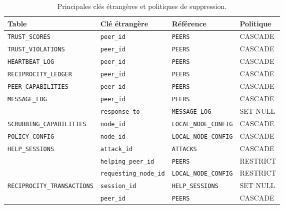 \begin{table}[H]
\centering
\caption{Principales clés étrangères et politiques de suppression.}
\label{tab:fk}
\small
\renewcommand{\arraystretch}{1.35}

\begin{tabularx}{\textwidth}{|l|l|l|X|}
\hline
\textbf{Table} & \textbf{Clé étrangère} & \textbf{Référence} & \textbf{Politique} \\
\hline
\texttt{TRUST\_SCORES}         & \texttt{peer\_id}          & \texttt{PEERS}              & CASCADE  \\
\hline
\texttt{TRUST\_VIOLATIONS}     & \texttt{peer\_id}          & \texttt{PEERS}              & CASCADE  \\
\hline
\texttt{HEARTBEAT\_LOG}        & \texttt{peer\_id}          & \texttt{PEERS}              & CASCADE  \\
\hline
\texttt{RECIPROCITY\_LEDGER}   & \texttt{peer\_id}          & \texttt{PEERS}              & CASCADE  \\
\hline
\texttt{PEER\_CAPABILITIES}    & \texttt{peer\_id}          & \texttt{PEERS}              & CASCADE  \\
\hline
\multirow{2}{*}{\texttt{MESSAGE\_LOG}}
    & \texttt{peer\_id}     & \texttt{PEERS}        & CASCADE  \\
\cline{2-4}
    & \texttt{response\_to} & \texttt{MESSAGE\_LOG} & SET NULL \\
\hline
\texttt{SCRUBBING\_CAPABILITIES} & \texttt{node\_id}          & \texttt{LOCAL\_NODE\_CONFIG} & CASCADE  \\
\hline
\texttt{POLICY\_CONFIG}        & \texttt{node\_id}          & \texttt{LOCAL\_NODE\_CONFIG} & CASCADE  \\
\hline
\multirow{2}{*}{\texttt{HELP\_SESSIONS}}
    & \texttt{attack\_id}        & \texttt{ATTACKS} & CASCADE  \\
\cline{2-4}
    & \texttt{helping\_peer\_id} & \texttt{PEERS}   & RESTRICT \\
    \cline{2-4}
    & \texttt{requesting\_node\_id} & \texttt{LOCAL\_NODE\_CONFIG}   & RESTRICT \\
\hline


\multirow{2}{*}{\texttt{RECIPROCITY\_TRANSACTIONS}}
    & \texttt{session\_id} & \texttt{HELP\_SESSIONS} & SET NULL \\
\cline{2-4}
    & \texttt{peer\_id}    & \texttt{PEERS}          & CASCADE  \\
\hline
\end{tabularx}
\end{table}
